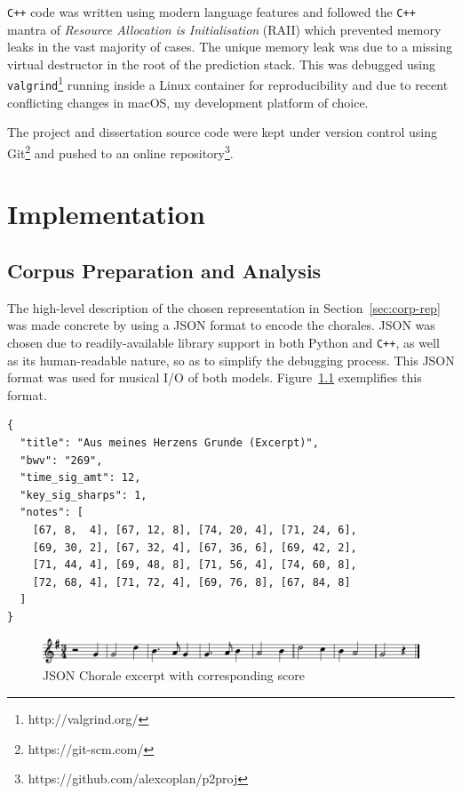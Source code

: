 \documentclass[12pt,a4paper,twoside,openright]{report}
\newcommand{\sref}[1]{Section~\ref{#1}}
\begin{document}
\texttt{C++} code was written using modern language features and followed the
\texttt{C++} mantra of \emph{Resource Allocation is Initialisation} (RAII) which
prevented memory leaks in the vast majority of cases. The unique memory leak was
due to a missing virtual destructor in the root of the prediction stack. This
was debugged using \texttt{valgrind}\footnote{http://valgrind.org/} running
inside a Linux container for reproducibility and due to recent conflicting
changes in macOS, my development platform of choice.

The project and dissertation source code were kept under version control using
Git\footnote{https://git-scm.com/} and pushed to an online
repository\footnote{https://github.com/alexcoplan/p2proj}.

\chapter{Implementation}\label{chap:impl}

\section{Corpus Preparation and Analysis}\label{sec:corpus-prep-analysis}

The high-level description of the chosen representation in
\sref{sec:corp-rep} was made concrete by using a JSON format to encode
the chorales. JSON was chosen due to readily-available library support in both
Python and \texttt{C++}, as well as its human-readable nature, so as to simplify
the debugging process. This JSON format was used for musical I/O of both models.
Figure~\ref{fig:chorale-excerpt} exemplifies this format. 

\vspace{4mm}
\begin{verbatim}
{
  "title": "Aus meines Herzens Grunde (Excerpt)",
  "bwv": "269",
  "time_sig_amt": 12,
  "key_sig_sharps": 1,
  "notes": [
    [67, 8,  4], [67, 12, 8], [74, 20, 4], [71, 24, 6], 
    [69, 30, 2], [67, 32, 4], [67, 36, 6], [69, 42, 2], 
    [71, 44, 4], [69, 48, 8], [71, 56, 4], [74, 60, 8], 
    [72, 68, 4], [71, 72, 4], [69, 76, 8], [67, 84, 8]
  ]
}
\end{verbatim}

\begin{figure}[H]
\centering
\includegraphics[width=450pt]{figs/aus_meines_excerpt.pdf}
\caption{JSON Chorale excerpt with corresponding score}
\label{fig:chorale-excerpt}
\end{figure}
\end{document}
